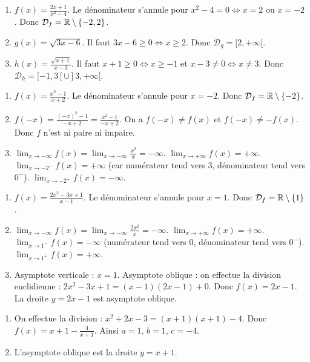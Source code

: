 \begin{enumerate}[label=\alph*)]
\item \(f(x)=\frac{2x+1}{x^2-4}\). Le dénominateur s'annule pour \(x^2-4=0\iff x=2\) ou \(x=-2\). Donc \(\mathcal{D}_f=\mathbb{R}\setminus\{-2,2\}\).
\item \(g(x)=\sqrt{3x-6}\). Il faut \(3x-6\ge0\iff x\ge2\). Donc \(\mathcal{D}_g=[2,+\infty[\).
\item \(h(x)=\frac{\sqrt{x+1}}{x-3}\). Il faut \(x+1\ge0\iff x\ge-1\) et \(x-3\neq0\iff x\neq3\). Donc \(\mathcal{D}_h=[-1,3[\cup]3,+\infty[\).
\end{enumerate}

\begin{enumerate}[label=\alph*)]
\item \(f(x)=\frac{x^2-1}{x+2}\). Le dénominateur s'annule pour \(x=-2\). Donc \(\mathcal{D}_f=\mathbb{R}\setminus\{-2\}\).
\item \(f(-x)=\frac{(-x)^2-1}{-x+2}=\frac{x^2-1}{-x+2}\). On a \(f(-x)\neq f(x)\) et \(f(-x)\neq -f(x)\). Donc \(f\) n'est ni paire ni impaire.
\item \(\lim_{x\to -\infty}f(x)=\lim_{x\to -\infty}\frac{x^2}{x}= -\infty\). \(\lim_{x\to +\infty}f(x)=+\infty\). \(\lim_{x\to -2^-}f(x)=+\infty\) (car numérateur tend vers 3, dénominateur tend vers $0^-$). \(\lim_{x\to -2^+}f(x)=-\infty\).
\end{enumerate}

\begin{enumerate}[label=\alph*)]
\item \(f(x)=\frac{2x^2-3x+1}{x-1}\). Le dénominateur s'annule pour \(x=1\). Donc \(\mathcal{D}_f=\mathbb{R}\setminus\{1\}\).
\item \(\lim_{x\to -\infty}f(x)=\lim_{x\to -\infty}\frac{2x^2}{x}= -\infty\). \(\lim_{x\to +\infty}f(x)=+\infty\). \(\lim_{x\to 1^-}f(x)=-\infty\) (numérateur tend vers 0, dénominateur tend vers $0^-$). \(\lim_{x\to 1^+}f(x)=+\infty\).
\item Asymptote verticale : \(x=1\). Asymptote oblique : on effectue la division euclidienne : \(2x^2-3x+1=(x-1)(2x-1)+0\). Donc \(f(x)=2x-1\). La droite \(y=2x-1\) est asymptote oblique.
\end{enumerate}

\begin{enumerate}[label=\alph*)]
\item On effectue la division : \(x^2+2x-3=(x+1)(x+1)-4\). Donc \(f(x)=x+1-\frac{4}{x+1}\). Ainsi \(a=1\), \(b=1\), \(c=-4\).
\item L'asymptote oblique est la droite \(y=x+1\).
\end{enumerate}

